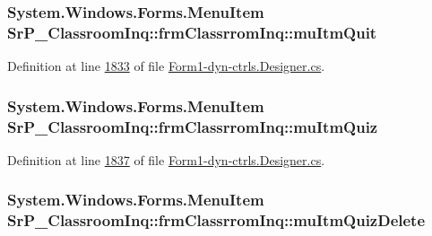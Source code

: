 \hypertarget{class_sr_p___classroom_inq_1_1frm_classrrom_inq_a139fd89a3fbbc5272712ac921557dd03}{
\subsubsection[{mu\-Itm\-Quit}]{\setlength{\rightskip}{0pt plus 5cm}\-System.\-Windows.\-Forms.\-Menu\-Item {\bf \-Sr\-P\-\_\-\-Classroom\-Inq\-::frm\-Classrrom\-Inq\-::mu\-Itm\-Quit}}}
\label{class_sr_p___classroom_inq_1_1frm_classrrom_inq_a139fd89a3fbbc5272712ac921557dd03}


\-Definition at line \hyperlink{_form1-dyn-ctrls_8_designer_8cs_source_l01833}{1833} of file \hyperlink{_form1-dyn-ctrls_8_designer_8cs_source}{\-Form1-\/dyn-\/ctrls.\-Designer.\-cs}.

\hypertarget{class_sr_p___classroom_inq_1_1frm_classrrom_inq_a081ac032f68b26f56aaf3c859fb5faa3}{
\subsubsection[{mu\-Itm\-Quiz}]{\setlength{\rightskip}{0pt plus 5cm}\-System.\-Windows.\-Forms.\-Menu\-Item {\bf \-Sr\-P\-\_\-\-Classroom\-Inq\-::frm\-Classrrom\-Inq\-::mu\-Itm\-Quiz}}}
\label{class_sr_p___classroom_inq_1_1frm_classrrom_inq_a081ac032f68b26f56aaf3c859fb5faa3}


\-Definition at line \hyperlink{_form1-dyn-ctrls_8_designer_8cs_source_l01837}{1837} of file \hyperlink{_form1-dyn-ctrls_8_designer_8cs_source}{\-Form1-\/dyn-\/ctrls.\-Designer.\-cs}.

\hypertarget{class_sr_p___classroom_inq_1_1frm_classrrom_inq_a2d03550cfd9c6e91732a9a669089cb48}{
\subsubsection[{mu\-Itm\-Quiz\-Delete}]{\setlength{\rightskip}{0pt plus 5cm}\-System.\-Windows.\-Forms.\-Menu\-Item {\bf \-Sr\-P\-\_\-\-Classroom\-Inq\-::frm\-Classrrom\-Inq\-::mu\-Itm\-Quiz\-Delete}}}
\label{class_sr_p___classroom_inq_1_1frm_classrrom_inq_a2d03550cfd9c6e91732a9a669089cb48}


